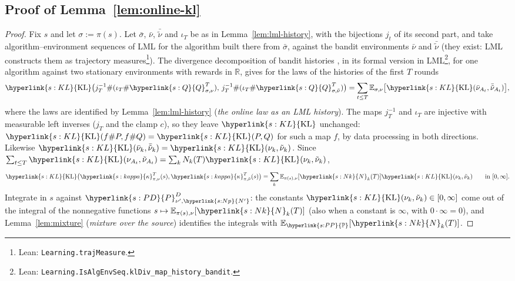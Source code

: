 \documentclass[11pt]{article}
\makeatletter
\newcommand{\sy}[2]{\hyperlink{#1}{#2}}
\newcommand{\E}{\mathbb{E}}
\newcommand{\PP}{\sy{s:PP}{\mathbb{P}}}
\newcommand{\KL}{\sy{s:KL}{\mathrm{KL}}}
\newcommand{\Np}{\sy{s:Np}{N'}}
\newcommand{\PD}{\sy{s:PD}{P}^{D}}
\newcommand{\Q}{\sy{s:Q}{Q}}
\newcommand{\kap}{\sy{s:kappa}{\kappa}}
\newcommand{\Nc}{\sy{s:Nk}{N}}
\newcommand{\leanfn}[1]{\ifincognita@blueprint\footnote{Lean: \nolinkurl{#1}.}\fi}
\makeatother
\begin{document}
\subsection{Proof of Lemma~\ref{lem:online-kl}}\label{sec:proof-online-kl}

\begin{proof}
Fix $s$ and let $\sigma:=\pi(s)$. Let $\bar\sigma$, $\bar\nu$, $\bar{\tilde\nu}$ and $\iota_T$ be as in
Lemma~\ref{lem:lml-history}, with the bijections $j_t$ of its second part, and take
algorithm--environment sequences of LML for the algorithm built there from $\bar\sigma$, against
the bandit environments $\bar\nu$ and $\bar{\tilde\nu}$ (they exist: LML constructs them as
trajectory measures\leanfn{Learning.trajMeasure}). The divergence decomposition of bandit histories
\citep[(8)]{GMS19}, in its formal version in LML\leanfn{Learning.IsAlgEnvSeq.klDiv_map_history_bandit},
for one algorithm against two stationary environments with rewards in $\mathbb R$, gives for the
laws of the histories of the first $T$ rounds
\begin{equation*}
\KL\big(j_T^{-1}\#(\iota_T\#\Q^T_{\sigma,\nu}),\,j_T^{-1}\#(\iota_T\#\Q^T_{\sigma,\tilde\nu})\big)
=\sum_{t\le T}\E_{\sigma,\nu}\big[\KL(\bar\nu_{A_t},\bar{\tilde\nu}_{A_t})\big],
\end{equation*}
where the laws are identified by Lemma~\ref{lem:lml-history} (\emph{the online law as an LML
history}). The maps $j_T^{-1}$ and $\iota_T$ are injective with measurable left inverses ($j_T$ and
the clamp $c$), so they leave $\KL$ unchanged: $\KL(f\#P,f\#Q)=\KL(P,Q)$ for such a map $f$, by data
processing in both directions. Likewise $\KL(\bar\nu_k,\bar{\tilde\nu}_k)=\KL(\nu_k,\tilde\nu_k)$.
Since
$\sum_{t\le T}\KL(\nu_{A_t},\tilde\nu_{A_t})=\sum_kN_k(T)\KL(\nu_k,\tilde\nu_k)$,
\begin{equation*}
\KL\big(\kap^T_{\pi,\nu}(s),\kap^T_{\pi,\tilde\nu}(s)\big)=\sum_k\E_{\pi(s),\nu}[\Nc_k(T)]\KL(\nu_k,\tilde\nu_k)
\qquad\text{in }[0,\infty].
\end{equation*}
Integrate in $s$ against $\PD_{\nu',\Np}$: the constants $\KL(\nu_k,\tilde\nu_k)\in[0,\infty]$ come out
of the integral of the nonnegative functions $s\mapsto\E_{\pi(s),\nu}[\Nc_k(T)]$ (also when a constant
is $\infty$, with $0\cdot\infty=0$), and Lemma~\ref{lem:mixture} (\emph{mixture over the source})
identifies the integrals with $\E_{\PP}[\Nc_k(T)]$.
\end{proof}
\end{document}
